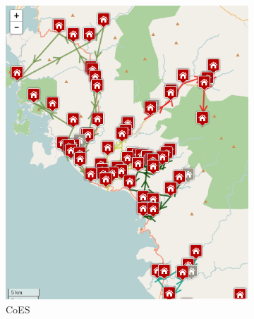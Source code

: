 \begin{figure}[!]
    \centering
    \begin{subfigure}[t]{0.5\textwidth}
        \centering
		\includegraphics[width=\textwidth]{../../Resources/Images/test_result_normal_field_coes}
		\caption{CoES}
		\label{fig:test_result_normal_field_coes}
    \end{subfigure}%
    ~ 
    \begin{subfigure}[t]{0.5\textwidth}
        \centering

\end{subfigure}
\end{figure}
